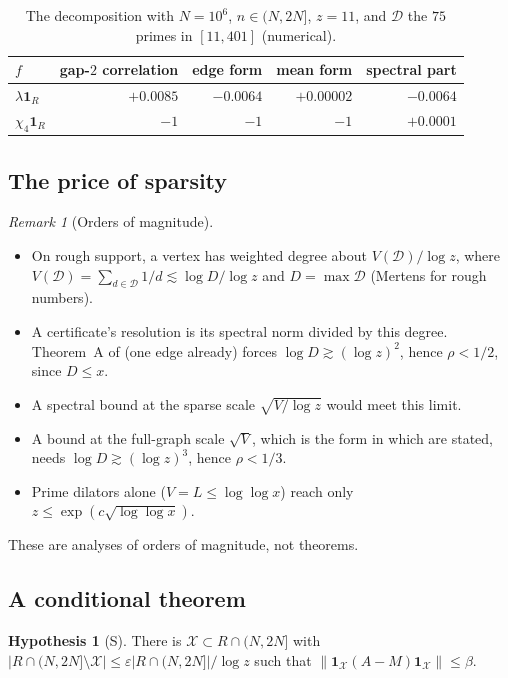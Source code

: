 \documentclass[11pt]{amsart}
\theoremstyle{definition}
\newtheorem{hypothesis}[theorem]{Hypothesis}
\theoremstyle{remark}
\newtheorem{remark}[theorem]{Remark}
\newcommand{\one}{\mathbf 1}
\newcommand{\cD}{\mathcal D}
\begin{document}
\begin{table}[h]
\centering\small
\begin{tabular}{lrrrr}
\toprule
$f$ & gap-$2$ correlation & edge form & mean form & spectral part\\
\midrule
$\lambda\one_R$ & $+0.0085$ & $-0.0064$ & $+0.00002$ & $-0.0064$\\
$\chi_4\one_R$ & $-1$ & $-1$ & $-1$ & $+0.0001$\\
\bottomrule
\end{tabular}
\caption{The decomposition with $N=10^6$, $n\in(N,2N]$, $z=11$, and $\cD$ the $75$ primes in $[11,401]$ (numerical).}\label{tab:hr}
\end{table}

\subsection{The price of sparsity}
\begin{remark}[Orders of magnitude]\label{rem:balance}
\begin{itemize}
\item On rough support, a vertex has weighted degree about $V(\cD)/\log z$, where $V(\cD)=\sum_{d\in\cD}1/d\lesssim\log D/\log z$ and $D=\max\cD$ (Mertens for rough numbers).
\item A certificate's resolution is its spectral norm divided by this degree. Theorem~A of \cite{Wan26b} (one edge already) forces $\log D\gtrsim(\log z)^2$, hence $\rho<1/2$, since $D\le x$.
\item A spectral bound at the sparse scale $\sqrt{V/\log z}$ would meet this limit.
\item A bound at the full-graph scale $\sqrt V$, which is the form in which \cite{HR21,Pil23} are stated, needs $\log D\gtrsim(\log z)^3$, hence $\rho<1/3$.
\item Prime dilators alone ($V=L\le\log\log x$) reach only $z\le\exp(c\sqrt{\log\log x})$.
\end{itemize}
These are analyses of orders of magnitude, not theorems.
\end{remark}

\subsection{A conditional theorem}
\begin{hypothesis}[S]
There is $\mathcal X\subset R\cap(N,2N]$ with $|R\cap(N,2N]\setminus\mathcal X|\le\varepsilon|R\cap(N,2N]|/\log z$ such that $\|\one_{\mathcal X}(A-M)\one_{\mathcal X}\|\le\beta$.
\end{hypothesis}
\end{document}

